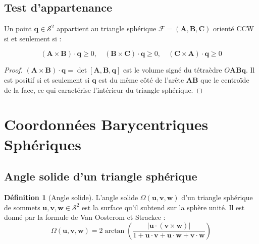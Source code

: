 \documentclass[12pt, a4paper]{article}
\theoremstyle{definition}
\newtheorem{definition}{Définition}[section]
\newcommand{\vect}[1]{\bm{#1}}
\newcommand{\abs}[1]{\left| #1 \right|}
\newcommand{\cross}{\times}
\begin{document}
\subsection{Test d'appartenance}

Un point $\vect{q} \in \mathcal{S}^2$ appartient au triangle sphérique
$\mathcal{F} = (\vect{A}, \vect{B}, \vect{C})$ orienté CCW si et seulement si :

\begin{equation}
  (\vect{A} \cross \vect{B}) \cdot \vect{q} \geq 0, \quad
  (\vect{B} \cross \vect{C}) \cdot \vect{q} \geq 0, \quad
  (\vect{C} \cross \vect{A}) \cdot \vect{q} \geq 0
\end{equation}

\begin{proof}
  $(\vect{A} \cross \vect{B}) \cdot \vect{q} = \det[\vect{A}, \vect{B}, \vect{q}]$
  est le volume signé du tétraèdre $O\vect{A}\vect{B}\vect{q}$.
  Il est positif si et seulement si $\vect{q}$ est du même côté de l'arête
  $\vect{A}\vect{B}$ que le centroïde de la face, ce qui caractérise
  l'intérieur du triangle sphérique.
\end{proof}

\section{Coordonnées Barycentriques Sphériques}

\subsection{Angle solide d'un triangle sphérique}

\begin{definition}[Angle solide]
  L'angle solide $\Omega(\vect{u}, \vect{v}, \vect{w})$ d'un triangle sphérique
  de sommets $\vect{u}, \vect{v}, \vect{w} \in \mathcal{S}^2$ est la surface
  qu'il subtend sur la sphère unité. Il est donné par la formule de
  Van Oosterom et Strackee \cite{VanOosterom1983} :
  \begin{equation}
    \Omega(\vect{u}, \vect{v}, \vect{w}) = 2 \arctan\!\left(
      \frac{\abs{\vect{u} \cdot (\vect{v} \cross \vect{w})}}
           {1 + \vect{u} \cdot \vect{v} + \vect{u} \cdot \vect{w}
              + \vect{v} \cdot \vect{w}}
    \right)
    \label{eq:solid_angle}
  \end{equation}
\end{definition}
\end{document}

